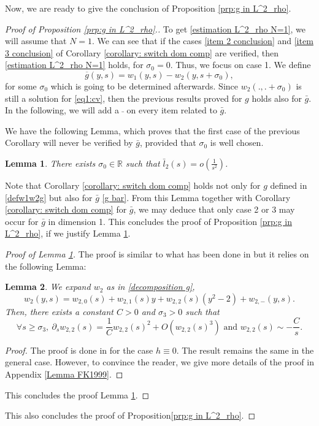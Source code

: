 \documentclass[11pt,a4paper]{article}
\newcommand{\1}{\mathbbm{1}}
\numberwithin{equation}{section}
\newcommand{\numberset}{\mathbb}
\newcommand{\R}{\numberset{R}}
\newtheorem{lemma}{Lemma}[section]
\theoremstyle{remark}
\begin{document}
Now, we are ready to give the conclusion of Proposition \ref{prp:g in L^2_rho}.
\begin{proof}[Proof of Proposition \ref{prp:g in L^2_rho}.]

To get \eqref{estimation L^2_rho N=1}, we will assume that $N=1$. We can see that if the cases \ref{item 2 conclusion} and \ref{item 3 conclusion} of Corollary \ref{corollary: switch dom comp} are verified, then \eqref{estimation L^2_rho N=1} holds, for $\sigma_0=0$.
Thus, we focus on case 1. We define 
\begin{equation}\label{g bar}
\overline{g}(y,s)=w_1(y,s)-w_2(y,s+\sigma_0),
\end{equation}
for some $\sigma_0$ which is going to be determined afterwards. Since $w_2(.,.+\sigma_0)$ is still a solution for \eqref{eq1:cv}, then the previous results proved for $g$ holds also for $\bar g$. In the following, we will add a $\bar{\,}$ on every item related to $\bar{g}$. 

We have the following Lemma, which proves that the first case of the previous Corollary will never be verified by $\bar g$, provided that $\sigma_0$ is well chosen.

\begin{lemma}\label{lemma contradiction}
There exists $\sigma_0\in \R$ such that $\bar{l}_2(s)=o(\frac{1}{s^2})$.
\end{lemma}
Note that Corollary \ref{corollary: switch dom comp} holds not only for $g$ defined in \eqref{defw1w2g} but also for $\bar{g}$ \eqref{g bar}. From this Lemma together with Corollary \ref{corollary: switch dom comp} for $\bar{g}$, we may deduce that only case 2 or 3 may occur for $\bar{g}$ in dimension 1. This concludes the proof of Proposition \ref{prp:g in L^2_rho}, if we justify Lemma \ref{lemma contradiction}.
\begin{proof}[Proof of Lemma \ref{lemma contradiction}]
The proof is similar to what has been done in \cite[Lemma 2.11]{KZ2000} but it relies on the following Lemma:
 
\begin{lemma}\label{lemma:FL1999}
We expand $w_2$ as in \eqref{decomposition g},
$$w_2(y,s )= w_{2,0}(s)+ w_{2,1}(s)y + w_{2,2}(s)( y^2-2) + w_{2,-} (y,s ).$$
Then, there exists a constant $C>0$ and $\sigma_3>0$ such that
\begin{equation}\label{eq w_2}
\forall s\geq \sigma_3,\ \partial_s w_{2,2}(s)=\frac{1}{C}w_{2,2}(s)^2+O(w_{2,2}(s)^3) \text{ and } w_{2,2}(s) \sim - \frac{C}{s}.
\end{equation}
\end{lemma}
\begin{proof}
The proof is done in \cite[Corollary 4.2 and Proposition 5.1]{FL1993} for the case $h\equiv 0$. The result remains the same in the general case. However, to convince the reader, we give more details of the proof in Appendix \ref{Lemma FK1999}.
\end{proof}
This concludes the proof Lemma \ref{lemma contradiction}.
\end{proof}
This also concludes the proof of Proposition\ref{prp:g in L^2_rho}.
\end{proof}
\end{document}
